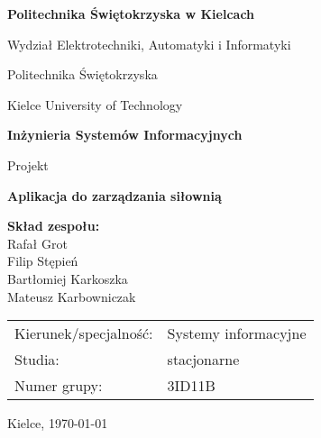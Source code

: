 \documentclass[../../spr.tex]{subfiles}
\begin{document}
\begin{titlepage}
  \centering

  {\fontsize{16}{18}\selectfont \bfseries Politechnika Świętokrzyska w Kielcach}

  \vspace{0.5cm}
  Wydział Elektrotechniki, Automatyki i Informatyki

  \vspace{1.5cm}
  {\large Politechnika Świętokrzyska}

  \vspace{0.2cm}
  {\large Kielce University of Technology}

  \vfill

  {\LARGE \bfseries Inżynieria Systemów Informacyjnych}

  \vspace{1.5cm}
  {\Huge Projekt}

  \vfill

  {\Huge \bfseries Aplikacja do zarządzania siłownią}

  \vfill

  \begin{flushleft}
    \begin{minipage}{0.5\textwidth}
      \large
      \textbf{Skład zespołu:} \\
      Rafał Grot \\
      Filip Stępień \\
      Bartłomiej Karkoszka \\
      Mateusz Karbowniczak
    \end{minipage}

    \vspace{2cm}

    \begin{minipage}{0.8\textwidth}
      \large
      \begin{tabular}{p{5cm}p{5cm}}
        Kierunek/specjalność: & Systemy informacyjne \\
        Studia:               & stacjonarne          \\
        Numer grupy:          & 3ID11B
      \end{tabular}
    \end{minipage}
  \end{flushleft}

  \vspace{1cm}

  \large Kielce, \today
\end{titlepage}
\end{document}
